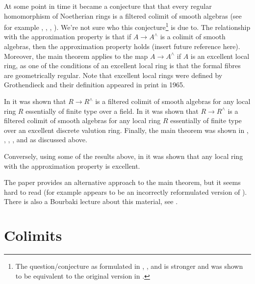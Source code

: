 \medskip\noindent
At some point in time it became a conjecture that
that every regular homomorphism of Noetherian rings is a
filtered colimit of smooth algebras (see for example
\cite{Raynaud-Rennes}, \cite{popescu-global}, \cite{Artin-power-series},
\cite{Artin-Denef}). We're not sure who this conjecture\footnote{The
question/conjecture as formulated in \cite{Artin-power-series},
\cite{Artin-Denef}, and \cite{popescu-global} is stronger and was shown
to be equivalent to the original version in \cite{Cipu}.}
is due to. The relationship with the approximation property is that if
$A \to A^\wedge$ is a colimit of smooth algebras, then the approximation
property holds (insert future reference here). Moreover, the main theorem
applies to the map $A \to A^\wedge$ if $A$ is an excellent local ring, as one
of the conditions of an excellent local ring is that the formal
fibres are geometrically regular. Note that excellent local rings
were defined by Grothendieck and their definition appeared in
print in 1965.

\medskip\noindent
In \cite{Artin-power-series} it was shown that
$R \to R^\wedge$ is a filtered colimit of smooth algebras for any
local ring $R$ essentially of finite type over a field.
In \cite{Rotthaus-Artin} it was shown that $R \to R^\wedge$
is a filtered colimit of smooth algebras for any local ring $R$
essentially of finite type over an excellent discrete valution ring.
Finally, the main theorem was shown in
\cite{popescu-GND}, \cite{popescu-GNDA}, \cite{popescu-letter}, 
\cite{Ogoma}, and \cite{swan} as discussed above.

\medskip\noindent
Conversely, using some of the results above, in \cite{Rotthaus-excellent}
it was shown that any local ring with the approximation property is excellent.

\medskip\noindent
The paper \cite{Spivakovsky} provides an alternative approach to the
main theorem, but it seems hard to read (for example
\cite[Lemma 5.2]{Spivakovsky} appears to be an incorrectly reformulated
version of \cite[Lemma 3]{Elkik}). There is also a Bourbaki
lecture about this material, see \cite{Teissier}.












\section{Colimits}
\label{section-colimits}

